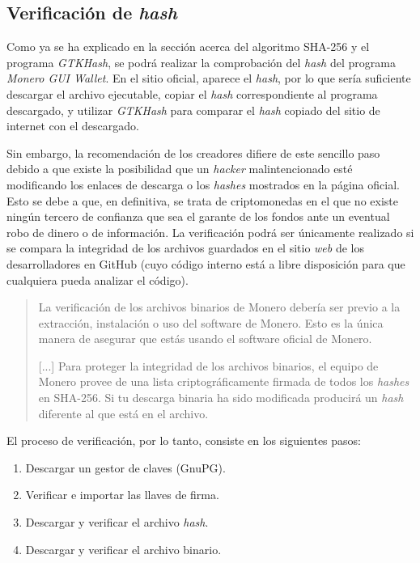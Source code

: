 \documentclass[12pt,a4paper,twoside]{book}
\begin{document}
\subsection{Verificación de \textit{hash}}
Como ya se ha explicado en la sección acerca del algoritmo SHA-256 y el programa \textit{GTKHash}, se podrá realizar la comprobación del \textit{hash} del programa \textit{Monero GUI Wallet}. En el sitio oficial, aparece el \textit{hash}, por lo que sería suficiente descargar el archivo ejecutable, copiar el \textit{hash} correspondiente al programa descargado, y utilizar \textit{GTKHash} para comparar el \textit{hash} copiado del sitio de internet con el descargado.

Sin embargo, la recomendación de los creadores difiere de este sencillo paso debido a que existe la posibilidad que un \textit{hacker} malintencionado esté modificando los enlaces de descarga o los \textit{hashes} mostrados en la página oficial. Esto se debe a que, en definitiva, se trata de criptomonedas en el que no existe ningún tercero de confianza que sea el garante de los fondos ante un eventual robo de dinero o de información. La verificación podrá ser únicamente realizado si se compara la integridad de los archivos guardados en el sitio \textit{web} de los desarrolladores en GitHub (cuyo código interno está a libre disposición para que cualquiera pueda analizar el código).

\begin{quotation}
La verificación de los archivos binarios de Monero debería ser previo a la extracción, instalación o uso del software de Monero. Esto es la única manera de asegurar que estás usando el software oficial de Monero.

[...] Para proteger la integridad de los archivos binarios, el equipo de Monero provee de una lista criptográficamente firmada de todos los \textit{hashes} en SHA-256. Si tu descarga binaria ha sido modificada producirá un \textit{hash} diferente al que está en el archivo. \cite{monero:verificacion}
\end{quotation}

El proceso de verificación, por lo tanto, consiste en los siguientes pasos:

\begin{enumerate}
\item Descargar un gestor de claves (GnuPG).
\item Verificar e importar las llaves de firma.
\item Descargar y verificar el archivo \textit{hash}.
\item Descargar y verificar el archivo binario.
\end{enumerate}
\end{document}
